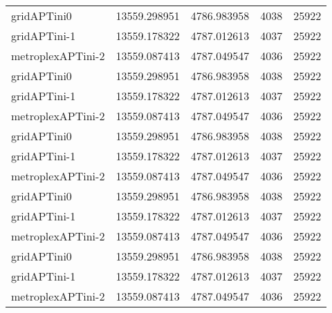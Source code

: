 \begin{table}[h]
\begin{longtable}{lrrrr}
gridAPTini0 & 13559.298951 & 4786.983958 & 4038 & 25922 \\
gridAPTini-1 & 13559.178322 & 4787.012613 & 4037 & 25922 \\
metroplexAPTini-2 & 13559.087413 & 4787.049547 & 4036 & 25922 \\
gridAPTini0 & 13559.298951 & 4786.983958 & 4038 & 25922 \\
gridAPTini-1 & 13559.178322 & 4787.012613 & 4037 & 25922 \\
metroplexAPTini-2 & 13559.087413 & 4787.049547 & 4036 & 25922 \\
gridAPTini0 & 13559.298951 & 4786.983958 & 4038 & 25922 \\
gridAPTini-1 & 13559.178322 & 4787.012613 & 4037 & 25922 \\
metroplexAPTini-2 & 13559.087413 & 4787.049547 & 4036 & 25922 \\
gridAPTini0 & 13559.298951 & 4786.983958 & 4038 & 25922 \\
gridAPTini-1 & 13559.178322 & 4787.012613 & 4037 & 25922 \\
metroplexAPTini-2 & 13559.087413 & 4787.049547 & 4036 & 25922 \\
gridAPTini0 & 13559.298951 & 4786.983958 & 4038 & 25922 \\
gridAPTini-1 & 13559.178322 & 4787.012613 & 4037 & 25922 \\
metroplexAPTini-2 & 13559.087413 & 4787.049547 & 4036 & 25922 \\
\end{longtable}
\end{table}

